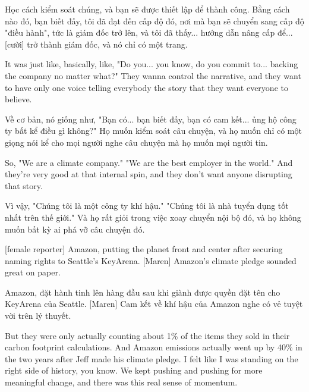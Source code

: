 \documentclass[a4paper]{article}
\begin{document}
	\begin{vietnamese-v2}
		Học cách kiểm soát chúng, và bạn sẽ được thiết lập để thành công.
		Bằng cách nào đó, bạn biết đấy, tôi đã đạt đến cấp độ đó, nơi mà bạn sẽ chuyển sang cấp độ "điều hành", tức là giám đốc trở lên, và tôi đã thấy... hướng dẫn nâng cấp để... [cười] trở thành giám đốc, và nó chỉ có một trang.
	\end{vietnamese-v2}
	
	It was just like, basically, like,
	"Do you... you know, do you commit to... backing the company no matter what?"
	They wanna control the narrative, and they want to have only one voice telling everybody the story that they want everyone to believe.
	
	\begin{vietnamese-v2}
		Về cơ bản, nó giống như,
		"Bạn có... bạn biết đấy, bạn có cam kết... ủng hộ công ty bất kể điều gì không?"
		Họ muốn kiểm soát câu chuyện, và họ muốn chỉ có một giọng nói kể cho mọi người nghe câu chuyện mà họ muốn mọi người tin.
	\end{vietnamese-v2}
	
	So, "We are a climate company." "We are the best employer in the world."
	And they're very good at that internal spin, and they don't want anyone disrupting that story.
	
	\begin{vietnamese-v2}
		Vì vậy, "Chúng tôi là một công ty khí hậu." "Chúng tôi là nhà tuyển dụng tốt nhất trên thế giới."
		Và họ rất giỏi trong việc xoay chuyển nội bộ đó, và họ không muốn bất kỳ ai phá vỡ câu chuyện đó.
	\end{vietnamese-v2}
	
	[female reporter] Amazon, putting the planet front and center after securing naming rights to Seattle's KeyArena.
	[Maren] Amazon's climate pledge sounded great on paper.
	
	\begin{vietnamese-v2}
		 Amazon, đặt hành tinh lên hàng đầu sau khi giành được quyền đặt tên cho KeyArena của Seattle.
		[Maren] Cam kết về khí hậu của Amazon nghe có vẻ tuyệt vời trên lý thuyết.
	\end{vietnamese-v2}
	
	But they were only actually counting about 1\% of the items they sold in their carbon footprint calculations.
	And Amazon emissions actually went up by 40\% in the two years after Jeff made his climate pledge.
	I felt like I was standing on the right side of history, you know.
	We kept pushing and pushing for more meaningful change, and there was this real sense of momentum.
	
\end{document}
